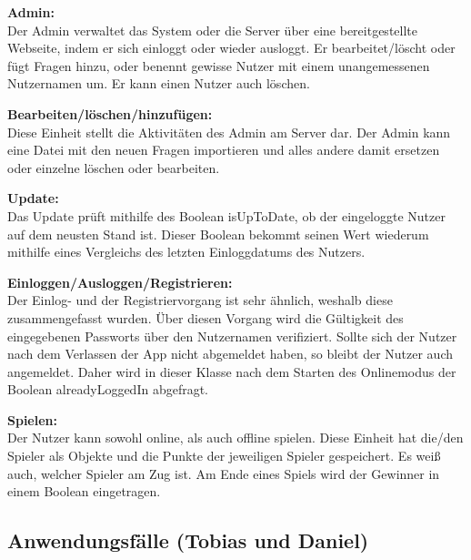 \documentclass[fontsize=12pt,paper=a4,twoside]{scrartcl}
\begin{document}
\textbf{Admin:}\\
Der Admin verwaltet das System oder die Server über eine bereitgestellte Webseite, indem er
sich einloggt oder wieder ausloggt. Er bearbeitet/löscht oder fügt Fragen hinzu, oder 
benennt gewisse Nutzer mit einem unangemessenen Nutzernamen um. Er kann einen Nutzer auch
löschen.

\textbf{Bearbeiten/löschen/hinzufügen:}\\
Diese Einheit stellt die Aktivitäten des Admin am Server dar. Der Admin kann eine Datei 
mit den neuen Fragen importieren und alles andere damit ersetzen oder einzelne löschen 
oder bearbeiten.

\textbf{Update:}\\
Das Update prüft mithilfe des Boolean isUpToDate, ob der eingeloggte Nutzer auf dem neusten Stand ist.
Dieser Boolean bekommt seinen Wert wiederum mithilfe eines Vergleichs des letzten Einloggdatums des
Nutzers.

\textbf{Einloggen/Ausloggen/Registrieren:}\\
Der Einlog- und der Registriervorgang ist sehr ähnlich, weshalb diese zusammengefasst wurden. 
Über diesen Vorgang wird die Gültigkeit des eingegebenen Passworts über den Nutzernamen verifiziert.
Sollte sich der Nutzer nach dem Verlassen der App nicht abgemeldet haben, so bleibt der Nutzer auch angemeldet.
Daher wird in dieser Klasse nach dem Starten des Onlinemodus der Boolean alreadyLoggedIn abgefragt.

\textbf{Spielen:}\\
Der Nutzer kann sowohl online, als auch offline spielen. Diese Einheit hat die/den Spieler
als Objekte und die Punkte der jeweiligen Spieler gespeichert. Es weiß auch, welcher Spieler am Zug ist.
Am Ende eines Spiels wird der Gewinner in einem Boolean eingetragen.



\subsection{Anwendungsfälle (Tobias und Daniel)}
\end{document}
